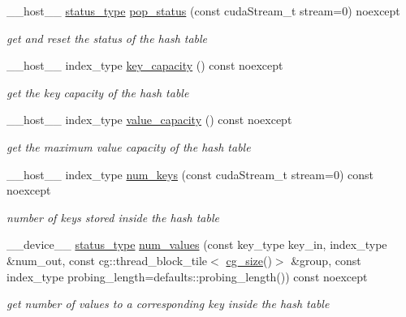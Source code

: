 \begin{DoxyCompactItemize}
\+\_\+\+\_\+host\+\_\+\+\_\+ \hyperlink{classwarpcore_1_1Status}{status\+\_\+type} \hyperlink{classwarpcore_1_1BucketListHashTable_a4ffc8f2f167156c082efbd434be1d314}{pop\+\_\+status} (const cuda\+Stream\+\_\+t stream=0) noexcept
\begin{DoxyCompactList}\small\item\em get and reset the status of the hash table \end{DoxyCompactList}\item 
\+\_\+\+\_\+host\+\_\+\+\_\+ index\+\_\+type \hyperlink{classwarpcore_1_1BucketListHashTable_a7902d5c984290d262f5964f55a666765}{key\+\_\+capacity} () const noexcept
\begin{DoxyCompactList}\small\item\em get the key capacity of the hash table \end{DoxyCompactList}\item 
\+\_\+\+\_\+host\+\_\+\+\_\+ index\+\_\+type \hyperlink{classwarpcore_1_1BucketListHashTable_a7777451fb2e8d4016f5baf2a0d22ced0}{value\+\_\+capacity} () const noexcept
\begin{DoxyCompactList}\small\item\em get the maximum value capacity of the hash table \end{DoxyCompactList}\item 
\+\_\+\+\_\+host\+\_\+\+\_\+ index\+\_\+type \hyperlink{classwarpcore_1_1BucketListHashTable_a6667de3a96ab1e7a1b26461eea6d4144}{num\+\_\+keys} (const cuda\+Stream\+\_\+t stream=0) const noexcept
\begin{DoxyCompactList}\small\item\em number of keys stored inside the hash table \end{DoxyCompactList}\item 
\+\_\+\+\_\+device\+\_\+\+\_\+ \hyperlink{classwarpcore_1_1Status}{status\+\_\+type} \hyperlink{classwarpcore_1_1BucketListHashTable_a3c56e0b0e4c7954e65db41e752cd1218}{num\+\_\+values} (const key\+\_\+type key\+\_\+in, index\+\_\+type \&num\+\_\+out, const cg\+::thread\+\_\+block\+\_\+tile$<$ \hyperlink{classwarpcore_1_1BucketListHashTable_a3807ac1b39b47617d862c5dd17f21330}{cg\+\_\+size}()$>$ \&group, const index\+\_\+type probing\+\_\+length=defaults\+::probing\+\_\+length()) const noexcept
\begin{DoxyCompactList}\small\item\em get number of values to a corresponding key inside the hash table \end{DoxyCompactList}\item 

\end{DoxyCompactItemize}
